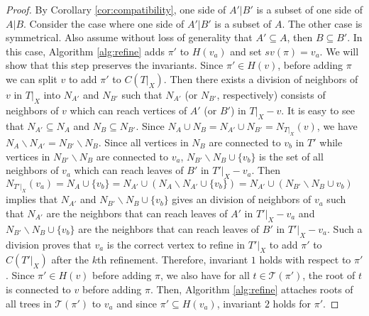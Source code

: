 \documentclass{bmcart}
\begin{document}
\begin{proof}
    By Corollary \ref{cor:compatibility}, one side of $A'|B'$ is a subset of one side of $A|B$. Consider the case where one side of $A'|B'$ is a subset of $A$. The other case is symmetrical. Also assume without loss of generality that $A' \subseteq A$, then $B \subseteq B'$. In this case, Algorithm \ref{alg:refine} adds $\pi'$ to $H(v_a)$ and set $sv(\pi) = v_a$. We will show that this step preserves the invariants. Since $\pi' \in H(v)$, before adding $\pi$ we can split $v$ to add $\pi'$ to $C(T|_X)$. Then there exists a division of neighbors of $v$ in $T|_X$ into $N_{A'}$ and $N_{B'}$ such that $N_{A'}$ (or $N_{B'}$, respectively) consists of neighbors of $v$ which can reach vertices of $A'$ (or $B'$) in $T|_X - v$. It is easy to see that $N_{A'} \subseteq N_A$ and $N_B \subseteq N_{B'}$. Since $N_A \cup N_B = N_{A'} \cup N_{B'} = N_{T|_X}(v)$, we have $N_A \backslash N_{A'} = N_{B'} \backslash N_B$. Since all vertices in $N_B$ are connected to $v_b$ in $T'$ while vertices in $N_{B'} \backslash N_B$ are connected to $v_a$, $N_{B'} \backslash N_B \cup \{v_b\}$ is the set of all neighbors of $v_a$ which can reach leaves of $B'$ in $T'|_X - v_a$. Then $N_{T'|_X}(v_a) = N_A \cup \{v_b\} = N_{A'} \cup (N_A \backslash N_{A'} \cup \{v_b\}) = N_{A'} \cup (N_{B'} \backslash N_B \cup v_b)$ implies that $N_{A'}$ and $N_{B'} \backslash N_B \cup \{v_b\}$ gives an division of neighbors of $v_a$ such that $N_{A'}$ are the neighbors that can reach leaves of $A'$ in $T'|_X -v_a$ and $N_{B'} \backslash N_B \cup \{v_b\}$ are the neighbors that can reach leaves of $B'$ in $T'|_X -v_a$. Such a division proves that $v_a$ is the correct vertex to refine in $T'|_X$ to add $\pi'$ to $C(T'|_X)$ after the $k$th refinement. Therefore, invariant $1$ holds with respect to $\pi'$. Since $\pi' \in H(v)$ before adding $\pi$, we also have for all $t \in \mathcal{T}(\pi')$, the root of $t$ is connected to $v$ before adding $\pi$. Then, Algorithm \ref{alg:refine} attaches roots of all trees in $\mathcal{T}(\pi')$ to $v_a$ and since $\pi' \subseteq H(v_a)$, invariant $2$ holds for $\pi'$. \smallskip


\end{proof}
\end{document}
